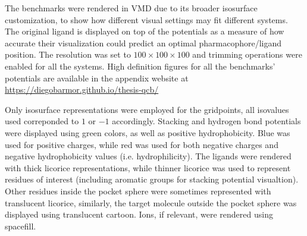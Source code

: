   The benchmarks were rendered in VMD due to its broader isosurface customization, to show how different visual settings may fit different systems. The original ligand is displayed on top of the potentials as a measure of how accurate their visualization could predict an optimal pharmacophore/ligand position. The resolution was set to $100 \times 100 \times 100$ and trimming operations were enabled for all the systems. High definition figures for all the benchmarks' potentials are available in the appendix website at \url{https://diegobarmor.github.io/thesis-qcb/}

  Only isosurface representations were employed for the gridpoints, all isovalues used correponded to $1$ or $-1$ accordingly. Stacking and hydrogen bond potentials were displayed using green colors, as well as positive hydrophobicity. Blue was used for positive charges, while red was used for both negative charges and negative hydrophobicity values (i.e. hydrophilicity). The ligands were rendered with thick licorice representations, while thinner licorice was used to represent residues of interest (including aromatic groups for stacking potential visualtion). Other residues inside the pocket sphere were sometimes represented with translucent licorice, similarly, the target molecule outside the pocket sphere was displayed using translucent cartoon. Ions, if relevant, were rendered using spacefill.

